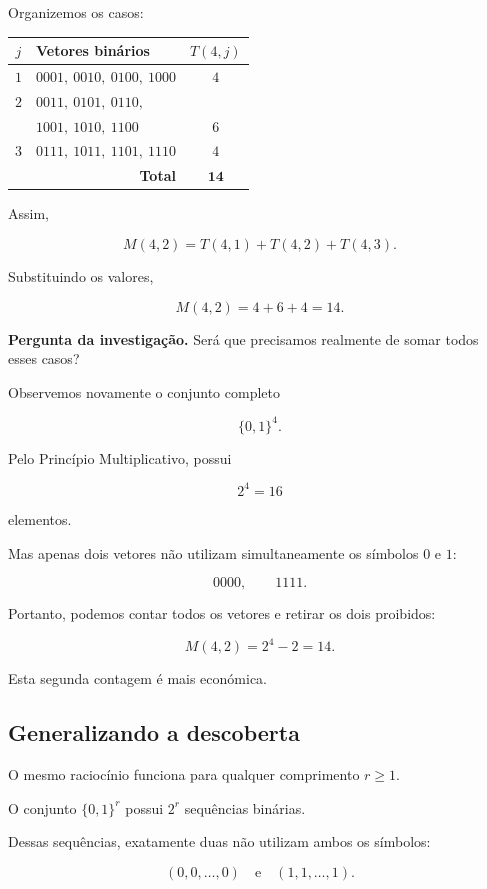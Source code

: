 \documentclass[11pt,a4paper,oneside]{book}
\newcommand{\Pergunta}[1]{\begin{perguntabox}\textbf{Pergunta da investigação.} #1\end{perguntabox}}
\renewcommand\arraystretch{1.18}
\begin{document}
Organizemos os casos:

\begin{center}
\renewcommand{\arraystretch}{1.45}
\begin{tabular}{c|l|c}
\hline
$j$ & \textbf{Vetores binários} & $T(4,j)$\\
\hline
$1$ &
$0001,\ 0010,\ 0100,\ 1000$ & $4$\\
\hline
$2$ &
$0011,\ 0101,\ 0110,$ &\\
    &
$1001,\ 1010,\ 1100$ & $6$\\
\hline
$3$ &
$0111,\ 1011,\ 1101,\ 1110$ & $4$\\
\hline
\multicolumn{2}{r|}{\textbf{Total}}&
$\mathbf{14}$\\
\hline
\end{tabular}
\end{center}

Assim,

\[
M(4,2)=T(4,1)+T(4,2)+T(4,3).
\]

Substituindo os valores,

\[
M(4,2)=4+6+4=14.
\]

\Pergunta{Será que precisamos realmente
de somar todos esses casos?}

Observemos novamente o conjunto completo

\[
\{0,1\}^4.
\]

Pelo Princípio Multiplicativo, possui

\[
2^4=16
\]

elementos.

Mas apenas dois vetores não utilizam
simultaneamente os símbolos $0$ e $1$:

\[
0000,\qquad1111.
\]

Portanto, podemos contar todos os vetores
e retirar os dois proibidos:

\[
M(4,2)=2^4-2=14.
\]

Esta segunda contagem é mais económica.

\subsection*{Generalizando a descoberta}

O mesmo raciocínio funciona para qualquer
comprimento $r\geq1$.

O conjunto $\{0,1\}^r$ possui $2^r$
sequências binárias.

Dessas sequências, exatamente duas não
utilizam ambos os símbolos:

\[
(0,0,\ldots,0)
\quad\text{e}\quad
(1,1,\ldots,1).
\]
\end{document}

